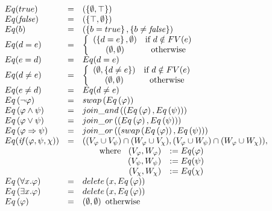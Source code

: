 \documentclass{article}
\begin{document}
\begin{equation*}
\begin{array}{lll}
Eq(true) & = & (\{ \emptyset, \top \})\\
Eq(\mathit{false}) & = & (\{ \top, \emptyset \})\\
Eq(b) & = & \left( \left\{ b=true\right\} , \{ b \neq \mathit{false} \} \right) \\
Eq(d=e) & = & \left\{
\begin{array}{cc}
\left( \left\{ d=e\right\} ,\emptyset \right) & \text{if }d\notin FV(e) \\
\left( \emptyset ,\emptyset \right) & \text{otherwise}%
\end{array}%
\right. \\
Eq(e=d) & = & Eq(d=e) \\
Eq(d\neq e) & = & \left\{
\begin{array}{cc}
\left( \emptyset ,\left\{ d\neq e\right\} \right) & \text{if }d\notin FV(e)
\\
\left( \emptyset ,\emptyset \right) & \text{otherwise}%
\end{array}%
\right. \\
Eq(e\neq d) & = & Eq(d\neq e) \\
Eq\left( \lnot \varphi \right) & = & swap\left( Eq\left( \varphi \right)
\right) \\
Eq\left( \varphi \wedge \psi \right) & = & join\_and\left( \left( Eq\left(
\varphi \right) ,Eq\left( \psi \right) \right) \right) \\
Eq\left( \varphi \vee \psi \right) & = & join\_or\left( \left( Eq\left(
\varphi \right) ,Eq\left( \psi \right) \right) \right) \\
Eq\left( \varphi \Rightarrow \psi \right) & = & join\_or\left( \left(
swap\left( Eq\left( \varphi \right) \right) ,Eq\left( \psi \right) \right)
\right) \\
Eq(\mathit{if}(\varphi,\psi,\chi)) & = & ((V_\varphi \cup V_\psi) \cap (W_\varphi \cup V_\chi),(V_\varphi \cup W_\psi) \cap (W_\varphi \cup W_\chi)),\\
 & ~ & \qquad \text{where }
 \begin{array}[t]{rl}
  (V_\varphi,W_\varphi) &:= Eq(\varphi)\\
  (V_\psi,W_\psi) &:= Eq(\psi)\\
  (V_\chi,W_\chi) &:= Eq(\chi)\\
 \end{array}
\\
Eq\left( \forall x.\varphi \right) & = & delete\left( x,Eq\left( \varphi
\right) \right) \\
Eq\left( \exists x.\varphi \right) & = & delete\left( x,Eq\left( \varphi
\right) \right) \\
Eq\left( \varphi \right) & = & \left( \emptyset ,\emptyset \right) \text{
otherwise}%
\end{array}%
\end{equation*}%
\end{document}
